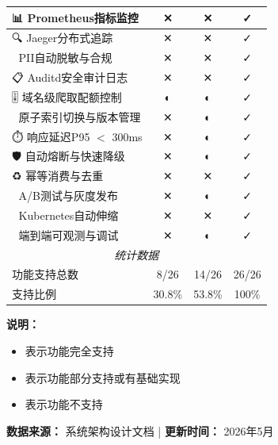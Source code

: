 \begin{table}[H]
{\begin{tabular}{p{4cm}|c|c|c}
\hline
📊 Prometheus指标监控 & \cellcolor{red!20}✕ & \cellcolor{red!20}✕ & \cellcolor{green!20}✓ \\
\hline
🔍 Jaeger分布式追踪 & \cellcolor{red!20}✕ & \cellcolor{red!20}✕ & \cellcolor{green!20}✓ \\
\hline
🔐 PII自动脱敏与合规 & \cellcolor{red!20}✕ & \cellcolor{red!20}✕ & \cellcolor{green!20}✓ \\
\hline
📋 Auditd安全审计日志 & \cellcolor{red!20}✕ & \cellcolor{red!20}✕ & \cellcolor{green!20}✓ \\
\hline
🎚️ 域名级爬取配额控制 & \cellcolor{yellow!20}◐ & \cellcolor{yellow!20}◐ & \cellcolor{green!20}✓ \\
\hline
🔁 原子索引切换与版本管理 & \cellcolor{red!20}✕ & \cellcolor{yellow!20}◐ & \cellcolor{green!20}✓ \\
\hline
⏱️ 响应延迟P95 $<$ 300ms & \cellcolor{red!20}✕ & \cellcolor{yellow!20}◐ & \cellcolor{green!20}✓ \\
\hline
🛡️ 自动熔断与快速降级 & \cellcolor{red!20}✕ & \cellcolor{yellow!20}◐ & \cellcolor{green!20}✓ \\
\hline
♻️ 幂等消费与去重 & \cellcolor{red!20}✕ & \cellcolor{red!20}✕ & \cellcolor{green!20}✓ \\
\hline
🎯 A/B测试与灰度发布 & \cellcolor{red!20}✕ & \cellcolor{yellow!20}◐ & \cellcolor{green!20}✓ \\
\hline
🚀 Kubernetes自动伸缩 & \cellcolor{red!20}✕ & \cellcolor{red!20}✕ & \cellcolor{green!20}✓ \\
\hline
🔧 端到端可观测与调试 & \cellcolor{red!20}✕ & \cellcolor{yellow!20}◐ & \cellcolor{green!20}✓ \\
\hline
\multicolumn{4}{c}{\textit{统计数据}} \\
\hline
功能支持总数 & 8/26 & 14/26 & 26/26 \\
\hline
支持比例 & 30.8\% & 53.8\% & 100\% \\
\hline
\end{tabular}
}

\raggedright
\small
\textbf{说明：} 
\begin{itemize}
    \item[$\checkmark$] 表示功能完全支持
    \item[$\approx$] 表示功能部分支持或有基础实现
    \item[$\times$] 表示功能不支持
\end{itemize}

\textbf{数据来源：} 系统架构设计文档 | \textbf{更新时间：} 2026年5月

\end{table}
